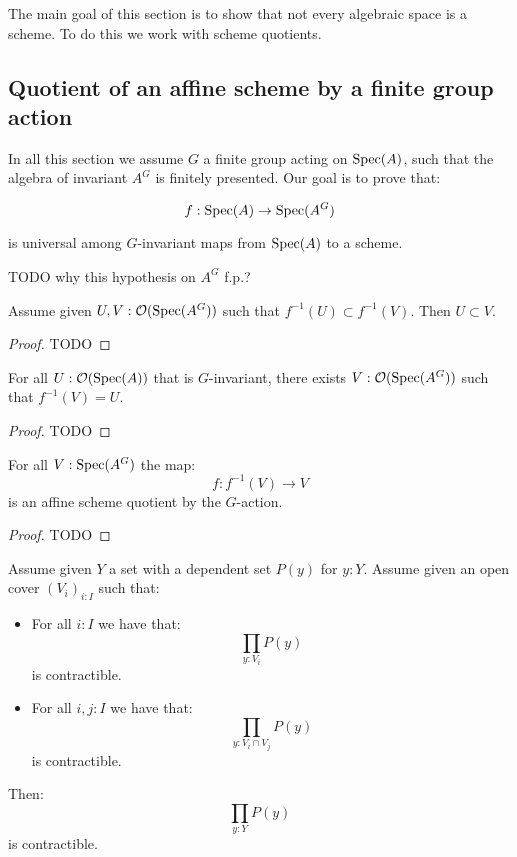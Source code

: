 The main goal of this section is to show that not every algebraic space is a scheme. To do this we work with scheme quotients.

\subsection{Quotient of an affine scheme by a finite group action}

In all this section we assume $G$ a finite group acting on $\operatorname{Spec}(A)$, such that the algebra of invariant $A^G$ is finitely presented. Our goal is to prove that:

\[f:\operatorname{Spec}(A)\to \operatorname{Spec}(A^G)\] 

is universal among $G$-invariant maps from $\operatorname{Spec}(A)$ to a scheme.

\begin{remark}
TODO why this hypothesis on $A^G$ f.p.?
\end{remark}

\begin{lemma}\label{injective-on-open}
Assume given $U,V:\mathcal{O}(\operatorname{Spec}(A^G))$ such that $f^{-1}(U) \subset f^{-1}(V)$. Then $U\subset V$. 
\end{lemma}

\begin{proof}
TODO
\end{proof}

\begin{lemma}\label{surjective-on-open}
For all $U: \mathcal{O}(\operatorname{Spec}(A))$ that is $G$-invariant, there exists $V:\mathcal{O}(\operatorname{Spec}(A^G))$ such that $f^{-1}(V)=U$.
\end{lemma}

\begin{proof}
TODO
\end{proof}

\begin{lemma}\label{affine-scheme-quotient-on-open}
For all $V:\operatorname{Spec}(A^G)$ the map:
\[f : f^{-1}(V) \to V\]
is an affine scheme quotient by the $G$-action.
\end{lemma}

\begin{proof}
TODO
\end{proof}

\begin{lemma}\label{piece-wise-contractible}
Assume given $Y$ a set with a dependent set $P(y)$ for $y:Y$. Assume given an open cover $(V_i)_{i:I}$ such that:
\begin{itemize}
\item For all $i:I$ we have that:
\[\prod_{y:V_i} P(y)\]
is contractible.
\item For all $i,j:I$ we have that:
\[\prod_{y:V_i\cap V_j} P(y)\]
is contractible.
\end{itemize}
Then:
\[\prod_{y:Y} P(y)\]
is contractible.
\end{lemma}

